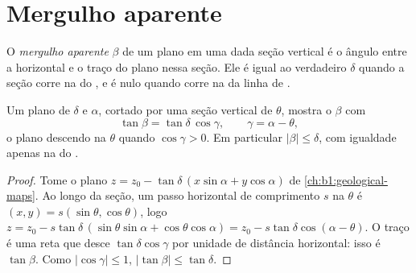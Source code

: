 \section{Mergulho aparente}\label{sec:b1:cross-sections:apparent}

\begin{definition}\label{def:b1:cross-sections:apparent-dip}
O \emph{mergulho aparente} $\beta$ de um plano em uma dada seção vertical é o ângulo entre a horizontal e o traço do plano nessa seção. Ele é igual ao  verdadeiro $\delta$ quando a seção corre na  do , e é nulo quando corre na  da linha de .
\end{definition}

\begin{theorem}\label{thm:b1:cross-sections:apparent-dip}
Um plano de  $\delta$ e  $\alpha$, cortado por uma seção vertical de  $\theta$, mostra o  $\beta$ com
\[
  \tan\beta = \tan\delta\,\cos\gamma, \qquad \gamma = \alpha - \theta ,
\]
o plano descendo na  $\theta$ quando $\cos\gamma > 0$. Em particular $|\beta| \le \delta$, com igualdade apenas na  do .
\end{theorem}

\begin{proof}
Tome o plano $z = z_0 - \tan\delta\,(x\sin\alpha + y\cos\alpha)$ de
\cref{ch:b1:geological-maps}. Ao longo da seção, um passo horizontal de comprimento
$s$ na  $\theta$ é $(x, y) = s(\sin\theta, \cos\theta)$, logo
$z = z_0 - s\tan\delta\,(\sin\theta\sin\alpha + \cos\theta\cos\alpha) =
z_0 - s\tan\delta\cos(\alpha - \theta)$. O traço é uma reta que
desce $\tan\delta\cos\gamma$ por unidade de distância horizontal: isso é
$\tan\beta$. Como $|\cos\gamma| \le 1$, $|\tan\beta| \le \tan\delta$.
\end{proof}

